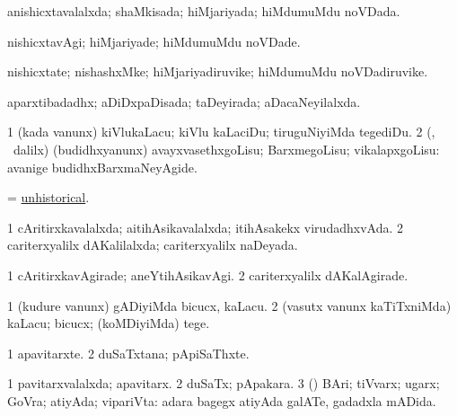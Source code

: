 \bentry
{} 
\gl{\gu}
\expl{}
\bmng
anishicxtavalalxda; shaMkisada; hiMjariyada; hiMdumuMdu noVDada. 
\emng
\eentry

\bentry
{} 
\gl{\kirxvi}
\expl{}
\bmng
nishicxtavAgi; hiMjariyade; hiMdumuMdu noVDade. 
\emng
\eentry

\bentry
{} 
\gl{\nA}
\expl{}
\bmng
nishicxtate; nishashxMke; hiMjariyadiruvike; hiMdumuMdu noVDadiruvike. 
\emng
\eentry

\bentry
{} 
\gl{\gu}
\expl{}
\bmng
aparxtibadadhx; aDiDxpaDisada; taDeyirada; aDacaNeyilalxda. 
\emng
\eentry

\bentry
{} 
\gl{\sakirx}
\expl{}
\bmng
\bnum
\num{1} (kada \mo vanunx) kiVlukaLacu; kiVlu kaLaciDu; tiruguNiyiMda tegediDu. 
\num{2} (\rUpa, \kanmu\ \BUkaq dalilx) (budidhxyanunx) avayxvasethxgoLisu; BarxmegoLisu; vikalapxgoLisu:  avanige budidhxBarxmaNeyAgide. 
\enum
\emng
\eentry

\bentry
{} 
\gl{\gu}
\expl{}
\bmng
= \hyperlink{unhistorical}{unhistorical}. 
\emng
\eentry

\bentry
{} 
\gl{\gu}
\expl{}
\bmng
\bnum
\num{1} cAritirxkavalalxda; aitihAsikavalalxda; itihAsakekx virudadhxvAda. 
\num{2} cariterxyalilx dAKalilalxda; cariterxyalilx naDeyada. 
\enum
\emng
\eentry

\bentry
{} 
\gl{\kirxvi}
\expl{}
\bmng
\bnum
\num{1} cAritirxkavAgirade; aneYtihAsikavAgi. 
\num{2} cariterxyalilx dAKalAgirade. 
\enum
\emng
\eentry

\bentry
{} 
\gl{\akirx}
\expl{}
\bmng
\bnum
\num{1} (kudure \mo vanunx) gADiyiMda bicucx, kaLacu. 
\num{2} (vasutx \mo vanunx kaTiTxniMda) kaLacu; bicucx; (koMDiyiMda) tege. 
\enum
\emng
\eentry

\bentry
{} 
\gl{\nA}
\expl{}
\bmng
\bnum
\num{1} apavitarxte. 
\num{2} duSaTxtana; pApiSaThxte. 
\enum
\emng
\eentry

\bentry
{} 
\gl{\gu}
\bmng
\bnum
\num{1} pavitarxvalalxda; apavitarx. 
\num{2} duSaTx; pApakara. 
\num{3} (\AmA) BAri; tiVvarx; ugarx; GoVra; atiyAda; vipariVta:  adara bagegx atiyAda galATe, gadadxla mADida. 
\enum
\emng
\eentry

